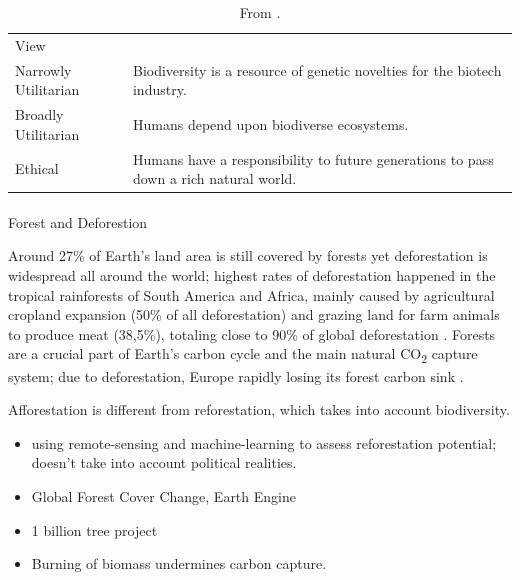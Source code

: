 \documentclass[
  letterpaper,
  DIV=11,
  numbers=noendperiod]{scrartcl}
\makeatletter
\let\oldparagraph\paragraph
\renewcommand{\paragraph}{
    \@ifstar
      \xxxParagraphStar
      \xxxParagraphNoStar
  }
\newcommand{\xxxParagraphStar}[1]{\oldparagraph*{#1}\mbox{}}
\newcommand{\xxxParagraphNoStar}[1]{\oldparagraph{#1}\mbox{}}
\makeatother
\begin{document}
\begin{longtable}[]{@{}
  >{\raggedright\arraybackslash}p{}
  >{\raggedright\arraybackslash}p{}@{}}
\caption{From \citet{mayWhyShouldWe2011}.}\tabularnewline
\toprule\noalign{}
\endfirsthead
\endhead
\bottomrule\noalign{}
\endlastfoot
View & \\
Narrowly Utilitarian & Biodiversity is a resource of genetic novelties
for the biotech industry. \\
Broadly Utilitarian & Humans depend upon biodiverse ecosystems. \\
Ethical & Humans have a responsibility to future generations to pass
down a rich natural world. \\
\end{longtable}

\paragraph{Forest and Deforestion}\label{forest-and-deforestion}

Around 27\% of Earth's land area is still covered by forests yet
deforestation is widespread all around the world; highest rates of
deforestation happened in the tropical rainforests of South America and
Africa, mainly caused by agricultural cropland expansion (50\% of all
deforestation) and grazing land for farm animals to produce meat
(38,5\%), totaling close to 90\% of global deforestation
\citep{FRA2020Remote2022}. Forests are a crucial part of Earth's carbon
cycle and the main natural CO\textsubscript{2} capture system; due to
deforestation, Europe rapidly losing its forest carbon sink
\citep{fredericsimonEuropeRapidlyLosing2022}.

Afforestation is different from reforestation, which takes into account
biodiversity.

\begin{itemize}
\item
  \citet{klostermanMappingGlobalPotential2022} using remote-sensing and
  machine-learning to assess reforestation potential; doesn't take into
  account political realities.
\item
  Global Forest Cover Change, Earth Engine
  \citet{hansenHighResolutionGlobalMaps2013}
\item
  1 billion tree project
  \citep{greenfieldVeNeverSaid2021, ErratumReportGlobal2020, bastinGlobalTreeRestoration2019}
\item
  Burning of biomass undermines carbon capture.
\end{itemize}
\end{document}
